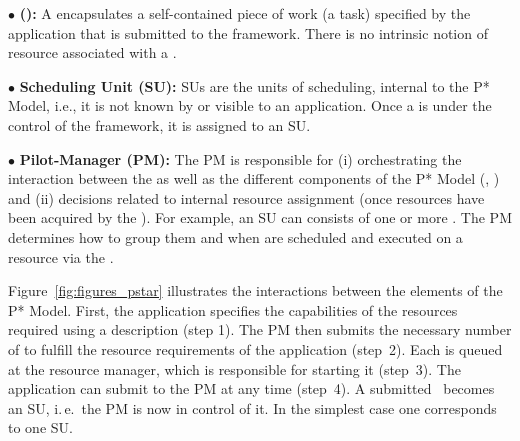 \documentclass{sig-alternate}
\begin{document}
\noindent$\bullet$ \textbf{\computeunit  (\cu):} A \cu  encapsulates a 
  self-contained piece of work (a task) specified by the application that is
  submitted to the \pilotjob framework. There is no intrinsic notion
  of resource associated with a \cu.

\noindent$\bullet$ \textbf{Scheduling Unit (SU):} SUs are the units of 
  scheduling, internal to the P* Model, i.e., it is not known by or
  visible to an application. Once a \cu is
  under the control of the \pilotjob framework, it is assigned
  to an SU.

\noindent$\bullet$ \textbf{Pilot-Manager (PM):} The PM is responsible for (i)
  orchestrating the interaction between the \pilots as well as the
  different components of the P* Model (\cus, \sus) and (ii) decisions
  related to internal resource assignment (once resources have been
  acquired by the \pilotjob).  For example, an SU can consists of one
  or more \cus. %
  The PM determines how to group them and when \sus are scheduled and
  executed on a resource via the \pilot.


Figure~\ref{fig:figures_pstar} illustrates the interactions between the
elements of the P* Model. First, the application specifies the capabilities of
the resources required using a \pilotjob description (step 1). The PM then
submits the necessary number of \pilots to fulfill the resource requirements
of the application (step~2). Each \pilot is queued at the resource manager,
which is responsible for starting it (step~3). The application can
submit \cus to the PM at any time (step~4). A submitted \cu \ becomes an SU,
i.\,e.\ the PM is now in control of it. In the simplest case one \cu  corresponds to one SU. 
\end{document}
